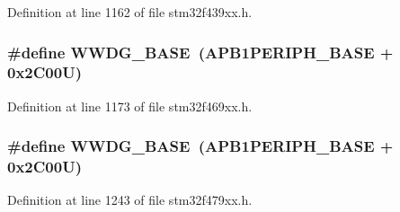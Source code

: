Definition at line 1162 of file stm32f439xx.\+h.

\subsubsection[{\texorpdfstring{W\+W\+D\+G\+\_\+\+B\+A\+SE}{WWDG_BASE}}]{\setlength{\rightskip}{0pt plus 5cm}\#define W\+W\+D\+G\+\_\+\+B\+A\+SE~({\bf A\+P\+B1\+P\+E\+R\+I\+P\+H\+\_\+\+B\+A\+SE} + 0x2\+C00\+U)}\hypertarget{group___peripheral__memory__map_ga9a5bf4728ab93dea5b569f5b972cbe62}{}\label{group___peripheral__memory__map_ga9a5bf4728ab93dea5b569f5b972cbe62}


Definition at line 1173 of file stm32f469xx.\+h.

\subsubsection[{\texorpdfstring{W\+W\+D\+G\+\_\+\+B\+A\+SE}{WWDG_BASE}}]{\setlength{\rightskip}{0pt plus 5cm}\#define W\+W\+D\+G\+\_\+\+B\+A\+SE~({\bf A\+P\+B1\+P\+E\+R\+I\+P\+H\+\_\+\+B\+A\+SE} + 0x2\+C00\+U)}\hypertarget{group___peripheral__memory__map_ga9a5bf4728ab93dea5b569f5b972cbe62}{}\label{group___peripheral__memory__map_ga9a5bf4728ab93dea5b569f5b972cbe62}


Definition at line 1243 of file stm32f479xx.\+h.

